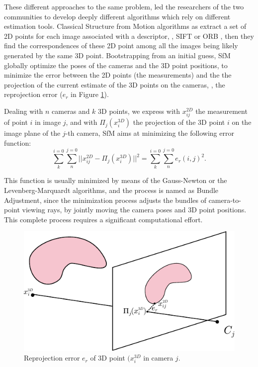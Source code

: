 These different approaches to the same problem, led the researchers of the two communities to develop deeply different algorithms which rely on different estimation tools.
Classical Structure from Motion algorithms as \cite{triggs2000bundle,sibley2009adaptive,wu2011multicore} extract a set of 2D points for each image associated with a descriptor, \eg, SIFT \cite{sift} or ORB \cite{orb},  then they find the correspondences of these 2D point among all the images being likely generated by the same 3D point. Bootstrapping from an initial guess, SfM globally optimize the poses of the cameras and the 3D point positions, to minimize the error between the 2D points (the measurements) and the the projection of the current estimate of the 3D points on the cameras, \ie, the reprojection error ($e_r$ in Figure \ref{fig:reprojectionerror}).

Dealing with $n$ cameras and $k$ 3D points, we express with $x_{ij}^{2D}$ the measurement of point $i$ in image $j$, and with $\Pi_j(x_i^{3D})$ the projection of the 3D point $i$ on the image plane of the $j$-th camera, SfM aims at minimizing the following error function:
\[
\sum_{k}^{i=0}\sum_{n}^{j=0}||x_{ij}^{2D} - \Pi_j(x_i^{3D})||^2 = \sum_{k}^{i=0}\sum_{n}^{j=0}e_r(i,j) ^2.
\]

This function is usually minimized by means of the Gauss-Newton or the Levenberg-Marquardt algorithms, and the process is named as Bundle Adjustment, since the minimization process adjusts the bundles of camera-to-point viewing rays, by jointly moving the camera poses and 3D point positions. This complete process requires a significant computational effort.

\begin{figure}[t]
\includegraphics[width=0.99\columnwidth]{./img/ch_soa/reproj}
 \caption{Reprojection error $e_r$ of 3D point $(x_i^{3D}$ in camera $j$.} 
    \label{fig:reprojectionerror}
\end{figure}



